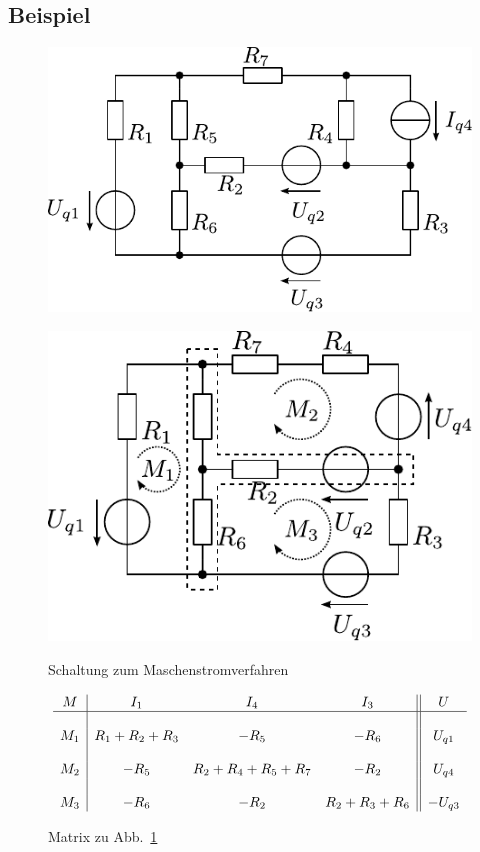 \newpage

\subsection{Beispiel}
\begin{figure}[h!]
\centering
\includegraphics[scale=\schscale]{mastro_sch.pdf}

\vspace{5mm}

\includegraphics[scale=\schscale]{mastro_sch_2.pdf}
\label{sch:mastro}
\caption{Schaltung zum Maschenstromverfahren}
\end{figure}

\begin{figure}[h!]
\footnotesize
\[ \begin{array}{c|ccc||c}

M	& I_1 & I_4 & I_3 & U \\
\hline &&&& \\
M_1 	& R_1 + R_2 + R_3 	& -R_5 				& -R_6 			& U_{q1} \\
&&&& \\
M_2 	& -R_5 			& R_2 + R_4 + R_5 + R_7 	& -R_2 			& U_{q4} \\
&&&& \\
M_3 	& -R_6 			& -R_2 				& R_2 + R_3 + R_6 	& -U_{q3} \\
\end{array}
\]
\normalsize
\caption{Matrix zu Abb.~\ref{sch:mastro}}
\end{figure}
